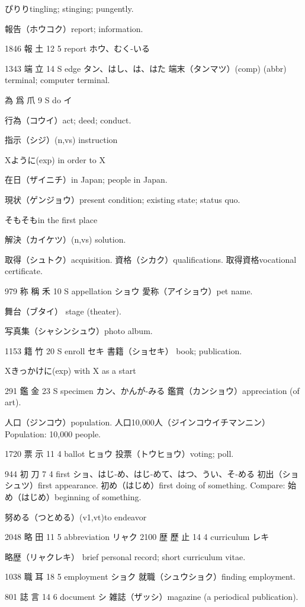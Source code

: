 ぴりりtingling; stinging; pungently.

報告（ホウコク）report; information.

1846 報  土 12 5  report ホウ、むく-いる

1343 端  立 14 S  edge タン、はし、は、はた
端末（タンマツ）(comp) (abbr) terminal; computer terminal.

為 爲 爪 9 S  do イ

行為（コウイ）act; deed; conduct.

指示（シジ）(n,vs) instruction

Xように(exp) in order to X

在日（ザイニチ）in Japan; people in Japan.

現状（ゲンジョウ）present condition; existing state; status quo.

そもそもin the first place

解決（カイケツ）(n,vs) solution.

取得（シュトク）acquisition.
資格（シカク）qualifications.
取得資格vocational certificate.

979	称	稱	禾	10	S		appellation	ショウ
愛称（アイショウ）pet name.

舞台（ブタイ）
stage (theater).

写真集（シャシンシュウ）photo album.

1153	籍		竹	20	S		enroll	セキ
書籍（ショセキ）
book; publication.

Xきっかけに(exp) with X as a start

291	鑑		金	23	S		specimen	カン、かんが-みる
鑑賞（カンショウ）appreciation (of art).

人口（ジンコウ）population.
人口10,000人（ジインコウイチマンニン）
Population: 10,000 people.

1720	票		示	11	4		ballot	ヒョウ
投票（トウヒョウ）voting; poll.

944	初		刀	7	4		first	ショ、はじ-め、はじ-めて、はつ、うい、そ-める
初出（ショシュツ）first appearance.
初め（はじめ）first doing of something.
Compare: 始め（はじめ）beginning of something.

努める（つとめる）(v1,vt)to endeavor

2048	略		田	11	5		abbreviation	リャク
2100	歴	歷	止	14	4		curriculum	レキ

略歴（リャクレキ）
brief personal record;
short curriculum vitae.

1038	職		耳	18	5		employment	ショク
就職（シュウショク）finding employment.

801	誌		言	14	6		document	シ
雑誌（ザッシ）magazine (a periodical publication).

